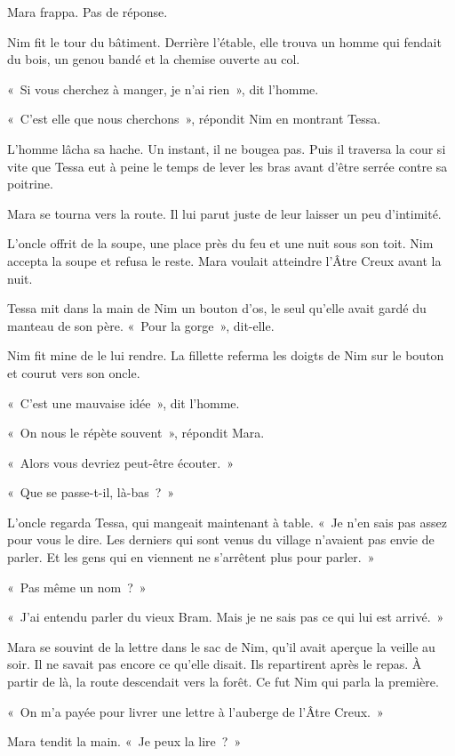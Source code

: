 \documentclass[10pt,a4paper]{article}
\begin{document}
Mara frappa. Pas de réponse.

Nim fit le tour du bâtiment. Derrière l’étable, elle trouva un homme qui fendait du bois, un genou bandé et la chemise ouverte au col.

«~Si vous cherchez à manger, je n’ai rien~», dit l’homme.

«~C’est elle que nous cherchons~», répondit Nim en montrant Tessa.

L’homme lâcha sa hache. Un instant, il ne bougea pas. Puis il traversa la cour si vite que Tessa eut à peine le temps de lever les bras avant d’être serrée contre sa poitrine.

Mara se tourna vers la route. Il lui parut juste de leur laisser un peu d’intimité.

L’oncle offrit de la soupe, une place près du feu et une nuit sous son toit. Nim accepta la soupe et refusa le reste. Mara voulait atteindre l’Âtre Creux avant la nuit.

Tessa mit dans la main de Nim un bouton d’os, le seul qu’elle avait gardé du manteau de son père. «~Pour la gorge~», dit-elle.

Nim fit mine de le lui rendre. La fillette referma les doigts de Nim sur le bouton et courut vers son oncle.

«~C’est une mauvaise idée~», dit l’homme.

«~On nous le répète souvent~», répondit Mara.

«~Alors vous devriez peut-être écouter.~»

«~Que se passe-t-il, là-bas~?~»

L’oncle regarda Tessa, qui mangeait maintenant à table. «~Je n’en sais pas assez pour vous le dire. Les derniers qui sont venus du village n’avaient pas envie de parler. Et les gens qui en viennent ne s’arrêtent plus pour parler.~»

«~Pas même un nom~?~»

«~J’ai entendu parler du vieux Bram. Mais je ne sais pas ce qui lui est arrivé.~»

Mara se souvint de la lettre dans le sac de Nim, qu’il avait aperçue la veille au soir. Il ne savait pas encore ce qu’elle disait.
Ils repartirent après le repas. À partir de là, la route descendait vers la forêt. Ce fut Nim qui parla la première.

«~On m’a payée pour livrer une lettre à l’auberge de l’Âtre Creux.~»

Mara tendit la main. «~Je peux la lire~?~»
\end{document}
